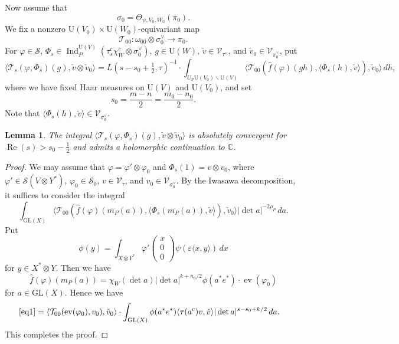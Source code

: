\documentclass[11pt]{amsart}
\numberwithin{equation}{section}
\theoremstyle{plain}
\newtheorem{lem}[thm]{Lemma}
\theoremstyle{definition}
\theoremstyle{remark}
\def\ev{\operatorname{ev}}
\def\Ind{\operatorname{Ind}}
\def\Re{\operatorname{Re}}
\def\GL{\mathrm{GL}}
\def\U{\mathrm{U}}
\def\CC{\mathbb{C}}
\def\T{\mathcal{T}}
\def\s{\mathscr{S}}
\def\V{\mathscr{V}}
\begin{document}
Now assume that 
\[
 \sigma_0 =\Theta_{\psi, V_0, W_0}(\pi_0).
\]
We fix a nonzero $\U(V_0) \times \U(W_0)$-equivariant map
\[
 \T_{00}: \omega_{00} \otimes \sigma_0^\vee \longrightarrow \pi_0.
\]
For $\varphi \in \s$, $\Phi_s \in \Ind^{\U(V)}_P(\tau^c_s \chi_W^c \otimes \sigma_0^\vee)$, $g \in \U(W)$,
$\check{v} \in \V_{\tau^\vee}$, and $\check{v}_0 \in \V_{\pi_0^\vee}$, put
\[
 \langle \T_s(\varphi, \Phi_s)(g), \check{v} \otimes \check{v}_0 \rangle = 
 L(s-s_0 + \tfrac{1}{2}, \tau)^{-1}
 \cdot \int_{U_P \U(V_0) \backslash \U(V)}
 \langle \T_{00}(\hat{f}(\varphi)(gh), \langle \Phi_s(h), \check{v} \rangle ), \check{v}_0 \rangle \, dh,
\]
where we have fixed Haar measures on $\U(V)$ and $\U(V_0)$, and set
\[
 s_0 = \frac{m-n}{2} = \frac{m_0-n_0}{2}.
\]
Note that $\langle \Phi_s(h), \check{v} \rangle \in \V_{\sigma_0^\vee}$.

\begin{lem}
\label{lem:def}
The integral $\langle \T_s(\varphi, \Phi_s)(g), \check{v} \otimes \check{v}_0 \rangle$ is absolutely convergent for $\Re(s) > s_0 - \frac{1}{2}$ and admits a holomorphic continuation to $\CC$.
\end{lem}

\begin{proof}
We may assume that $\varphi = \varphi' \otimes \varphi_0$ and $\Phi_s(1) = v \otimes v_0$, where $\varphi' \in \s(V \otimes Y^*)$, $\varphi_0 \in \s_0$, $v \in \V_{\tau}$, and $v_0 \in \V_{\sigma_0^\vee}$.
By the Iwasawa decomposition, it suffices to consider the integral
\begin{equation}
\label{eq1}
 \int_{\GL(X)} \langle \T_{00}(\hat{f}(\varphi)(m_P(a)), \langle \Phi_s(m_P(a)), \check{v} \rangle ), \check{v}_0 \rangle
 |\det a|^{-2 \rho_P} \, da.
\end{equation}
Put
\[
 \phi(y)
 = \int_{X \otimes Y^*} \varphi'
 \begin{pmatrix}
  x \\
  0 \\
  0
 \end{pmatrix}
 \psi(\varepsilon \langle x, y \rangle ) \, dx
\]
for $y \in X^* \otimes Y$.
Then we have
\[
 \hat{f}(\varphi)(m_P(a))
 = \chi_W(\det a) |\det a|^{k + n_0/2} \phi(a^* e^*) \cdot \ev(\varphi_0)
\]
for $a \in \GL(X)$.
Hence we have
\begin{align*}
 \eqref{eq1} & = \langle \T_{00}(\ev(\varphi_0), v_0), \check{v}_0 \rangle
 \cdot \int_{\GL(X)} \phi(a^* e^*) \langle \tau(a^c) v, \check{v} \rangle |\det a|^{s-s_0+k/2} \, da.
\end{align*}
This completes the proof.
\end{proof}
\end{document}
